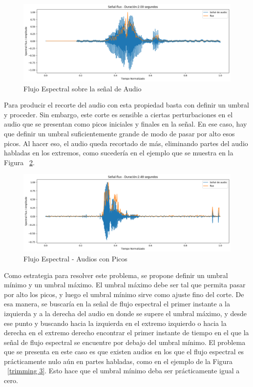 \documentclass[a4paper, 12pt]{article}
\begin{document}
\begin{figure}[h]
    \centering
    \includegraphics[width=0.8\linewidth]{trimming1.png}
    \caption{Flujo Espectral sobre la señal de Audio}
    \label{trimming 1}
\end{figure}

Para producir el recorte del audio con esta propiedad basta con definir un umbral y proceder. Sin embargo, este corte es sensible a ciertas perturbaciones en el audio que se presentan como picos iniciales y finales en la señal. En ese caso, hay que definir un umbral suficientemente grande de modo de pasar por alto esos picos. Al hacer eso, el audio queda recortado de más, eliminando partes del audio habladas en los extremos, como sucedería en el ejemplo que se muestra en la Figura ~\ref{trimming 2}.

\begin{figure}[h]
    \centering
    \includegraphics[width=0.8\linewidth]{trimming2.png}
    \caption{Flujo Espectral - Audios con Picos}
    \label{trimming 2}
\end{figure}

Como estrategia para resolver este problema, se propone definir un umbral mínimo y un umbral máximo. El umbral máximo debe ser tal que permita pasar por alto los picos, y luego el umbral mínimo sirve como ajuste fino del corte. De esa manera, se buscaría en la señal de flujo espectral el primer instante a la izquierda y a la derecha del audio en donde se supere el umbral máximo, y desde ese punto y buscando hacia la izquierda en el extremo izquierdo o hacia la derecha en el extremo derecho encontrar el primer instante de tiempo en el que la señal de flujo espectral se encuentre por debajo del umbral mínimo. El problema que se presenta en este caso es que existen audios en los que el flujo espectral es prácticamente nulo aún en partes habladas, como en el ejemplo de la Figura ~\ref{trimming 3}. Esto hace que el umbral mínimo deba ser prácticamente igual a cero.
\end{document}
